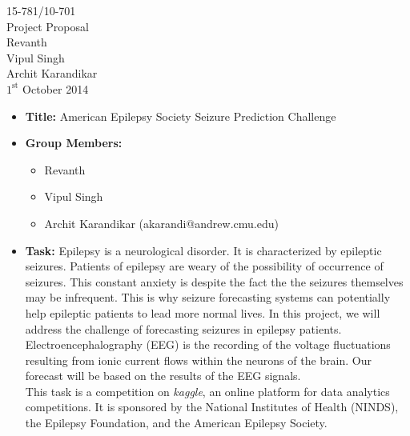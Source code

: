 \documentclass[11pt]{article}
\begin{document}
\medskip                        %

\thispagestyle{plain}
\begin{center}                  %
{\Large 15-781/10-701} \\
{\Large Project Proposal} \\
Revanth \\
Vipul Singh \\
Archit Karandikar \\
$1^\text{st}$ October 2014 \\
\end{center}

\begin{itemize}

\item
\textbf{Title:} American Epilepsy Society Seizure Prediction Challenge

\item
\textbf{Group Members:}
\begin{itemize}
\item Revanth
\item Vipul Singh
\item Archit Karandikar (akarandi@andrew.cmu.edu)
\end{itemize}

\item
\textbf{Task:} Epilepsy is a neurological disorder. It is characterized by epileptic seizures. Patients of epilepsy are weary of the possibility of occurrence of seizures. This constant anxiety is despite the fact the the seizures themselves may be infrequent. This is why seizure forecasting systems can potentially help epileptic patients to lead more normal lives. In this project, we will address the challenge of forecasting seizures in epilepsy patients. \\
\-\hspace{7pt} Electroencephalography (EEG) is the recording of the voltage fluctuations resulting from ionic current flows within the neurons of the brain. Our forecast will be based on the results of the EEG signals. \\
\-\hspace{7pt} This task is a competition on \textit{kaggle}, an online platform for data analytics competitions. It is sponsored by the National Institutes of Health (NINDS), the Epilepsy Foundation, and the American Epilepsy Society.


\end{itemize}
\end{document}
